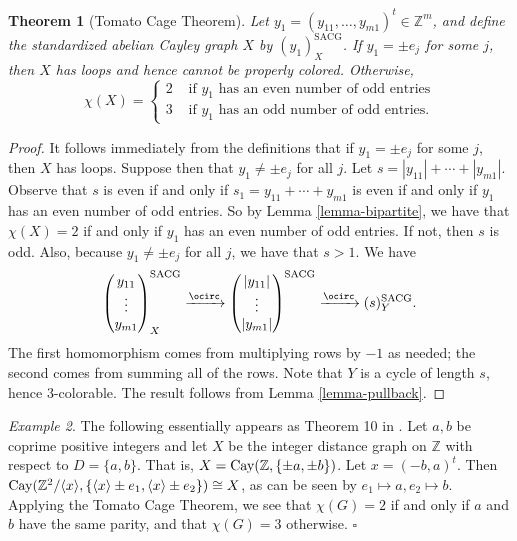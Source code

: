 \documentclass{article}
\newtheorem{Thm}{Theorem}[section]
\theoremstyle{definition}
\theoremstyle{remark}
\newtheorem{Ex}[Thm]{Example}
\begin{document}
\begin{Thm}[Tomato Cage Theorem]\label{theorem-tree-guard}
Let $y_1=(y_{11},\dots,y_{m1})^t\in\mathbb{Z}^m$, and define the standardized abelian Cayley graph $X$ by $(y_1)_X^\text{SACG}$.  If $y_1=\pm e_j$ for some $j$, then $X$ has loops and hence cannot be properly colored.  Otherwise,  \[\chi(X)=\begin{cases}

2 & \text{ if }y_1\text{ has an even number of odd entries}\\

3 & \text{ if }y_1\text{ has an odd number of odd entries.}\end{cases}\]
\end{Thm}\begin{proof}It follows immediately from the definitions that if $y_1=\pm e_j$ for some $j$, then $X$ has loops.  Suppose then that $y_1\neq\pm e_j$ for all $j$.  Let $s=|y_{11}|+\cdots+|y_{m1}|$.  Observe that $s$ is even if and only if $s_1=y_{11}+\cdots+y_{m1}$ is even if and only if $y_1$ has an even number of odd entries.  So by Lemma \ref{lemma-bipartite}, we have that $\chi(X)=2$ if and only if $y_1$ has an even number of odd entries.  If not, then $s$ is odd.  Also, because $y_1\neq\pm e_j$ for all $j$, we have that $s>1$.  We have \[
\begin{pmatrix}y_{11}\\
\vdots\\
y_{m1}\end{pmatrix}^{\text{SACG}}_X
    \xrightarrow{\ocirc}
    \begin{pmatrix}|y_{11}|\\
\vdots\\
|y_{m1}|\end{pmatrix}^{\text{SACG}}\xrightarrow{\ocirc}(s)^{\text{SACG}}_Y.
\]  The first homomorphism comes from multiplying rows by $-1$ as needed; the second comes from summing all of the rows.  Note that $Y$ is a cycle of length $s$, hence $3$-colorable.  The result follows from Lemma \ref{lemma-pullback}.\end{proof}

\begin{Ex}\label{example-ees} The following essentially appears as Theorem 10 in \cite{EES}.
Let $a,b$ be coprime positive integers and let $X$ be the integer distance graph on $\mathbb Z$ with respect to $D = \{ a, b \}$.
That is, $X = \textup{Cay}(\mathbb Z, \{ \pm a, \pm b \})$.  Let $x = (-b, a)^t$.
Then $\textup{Cay}(\mathbb Z^2 / \langle x \rangle, \{ \langle x \rangle \pm e_1, \langle x \rangle \pm e_2 \}) \cong X$, as can be seen by $e_1\mapsto a, e_2\mapsto b$.
Applying the Tomato Cage Theorem, we see that $\chi(G) = 2$ if and only if $a$ and $b$ have the same parity, and that $\chi(G) = 3$ otherwise.
\hfill $\square$
\end{Ex}
\end{document}
